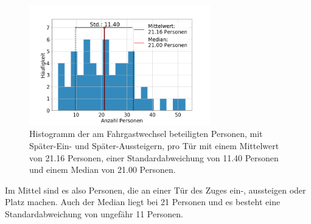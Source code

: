 \begin{figure}[H]
	\centering
		\includegraphics[width=0.7\textwidth]{pictures/data_evaluation/data_description/hist_persons.png}
	\caption{Histogramm der am Fahrgastwechsel beteiligten Personen, mit Später-Ein- und Später-Aussteigern, pro Tür mit einem Mittelwert von 21.16 Personen, einer Standardabweichung von 11.40 Personen und einem Median von 21.00 Personen.}
	\label{fig:histAllePersonen}
\end{figure}
Im Mittel sind es also  Personen, die an einer Tür des Zuges ein-, aussteigen oder Platz machen. Auch der Median liegt bei 21 Personen und es besteht eine Standardabweichung von ungefähr 11 Personen.
